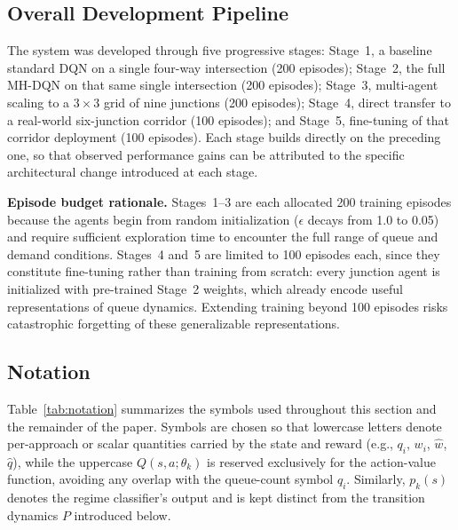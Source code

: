 \documentclass[lettersize,journal]{IEEEtran}
\begin{document}
\subsection{Overall Development Pipeline}

The system was developed through five progressive stages: Stage~1, a
baseline standard DQN on a single four-way intersection (200 episodes);
Stage~2, the full MH-DQN on that same single intersection (200 episodes);
Stage~3, multi-agent scaling to a $3\times3$ grid of nine junctions (200
episodes); Stage~4, direct transfer to a real-world six-junction corridor
(100 episodes); and Stage~5, fine-tuning of that corridor deployment (100
episodes). Each stage builds directly on the preceding one, so that
observed performance gains can be attributed to the specific architectural
change introduced at each stage.

\textbf{Episode budget rationale.}
Stages~1--3 are each allocated 200 training episodes because the agents
begin from random initialization ($\epsilon$ decays from 1.0 to 0.05) and
require sufficient exploration time to encounter the full range of queue and
demand conditions. Stages~4 and~5 are limited to 100 episodes each, since
they constitute fine-tuning rather than training from scratch: every
junction agent is initialized with pre-trained Stage~2 weights, which
already encode useful representations of queue dynamics. Extending training
beyond 100 episodes risks catastrophic forgetting of these generalizable
representations.

\subsection{Notation}

Table~\ref{tab:notation} summarizes the symbols used throughout this
section and the remainder of the paper. Symbols are chosen so that
lowercase letters denote per-approach or scalar quantities carried by the
state and reward (e.g., $q_i$, $w_i$, $\hat{w}$, $\hat{q}$), while the
uppercase $Q(s,a;\theta_k)$ is reserved exclusively for the action-value
function, avoiding any overlap with the queue-count symbol $q_i$. Similarly,
$p_k(s)$ denotes the regime classifier's output and is kept distinct from
the transition dynamics $P$ introduced below.
\end{document}
